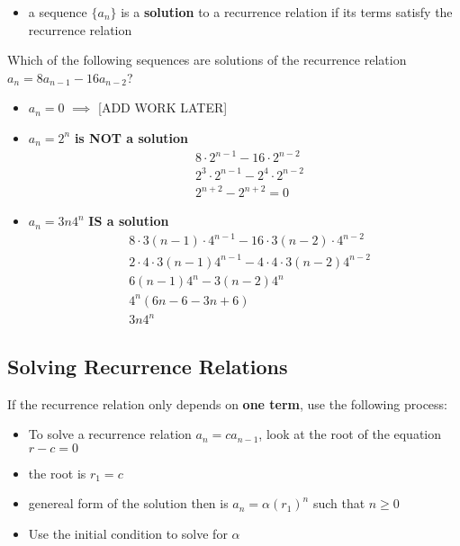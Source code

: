 \begin{itemize}
    \item a sequence $\{a_n\}$ is a \textbf{solution} to a recurrence relation if its terms satisfy the recurrence relation
\end{itemize}


\begin{problem}
    Which of the following sequences are solutions of the recurrence relation $a_n = 8a_{n-1} - 16a_{n-2}$?

    \begin{itemize}
        \item $a_n = 0$ $\implies$ [ADD WORK LATER] 
        \item $a_n = 2^n$ \textbf{is NOT a solution}
        \[
        \begin{aligned}
            &8\cdot 2^{n-1}-16\cdot 2^{n-2}\\
            &2^3\cdot 2^{n-1}-2^4\cdot 2^{n-2}\\
            &2^{n+2} - 2^{n+2} = 0
        \end{aligned}    
        \]
        \item $a_n = 3n4^n$ \textbf{IS a solution}
        \[
        \begin{aligned}
            &8\cdot 3(n-1)\cdot 4^{n-1} - 16 \cdot 3(n-2) \cdot 4^{n-2}\\
            &2\cdot 4\cdot 3(n-1)4^{n-1} - 4\cdot 4 \cdot 3 (n-2) 4^{n-2}\\
            &6(n-1)4^n - 3(n-2)4^n\\
            &4^n(6n-6-3n+6)\\
            &3n4^n
        \end{aligned}    
        \]
    \end{itemize}
\end{problem}

\subsection{Solving Recurrence Relations}


If the recurrence relation only depends on \textbf{one term}, use the following process:
\begin{itemize}
    \item To solve a recurrence relation $a_n=ca_{n-1}$, look at the root of the equation $r-c=0$
    \item the root is $r_1 = c$
    \item genereal form of the solution then is $a_n=\alpha (r_1)^n$ such that $n \ge 0$
    \item Use the initial condition to solve for $\alpha$
\end{itemize}

